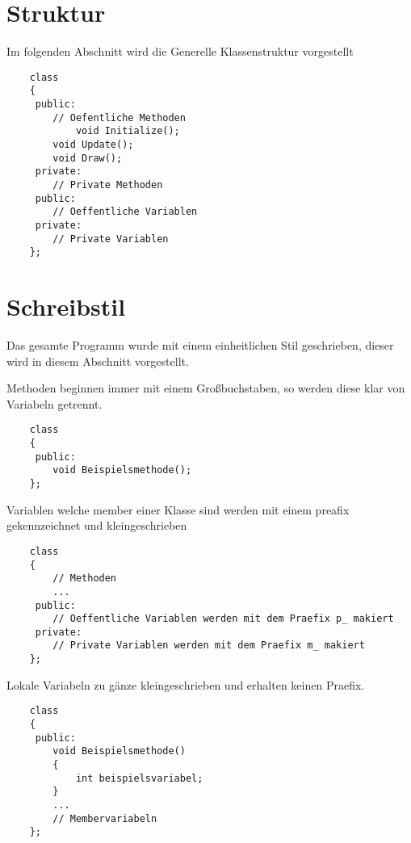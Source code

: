 
\section{Struktur}
Im folgenden Abschnitt wird die Generelle Klassenstruktur vorgestellt

\begin{lstlisting}	
	class
	{
	 public:
		// Oefentliche Methoden
	        void Initialize(); 
		void Update(); 
		void Draw(); 
 	 private: 
		// Private Methoden
	 public: 
		// Oeffentliche Variablen
	 private:
		// Private Variablen
	};
\end{lstlisting}

\section{Schreibstil}
Das gesamte Programm wurde mit einem einheitlichen Stil geschrieben, dieser wird in diesem Abschnitt vorgestellt. 

Methoden beginnen immer mit einem Großbuchstaben, so werden diese klar von Variabeln getrennt.

\begin{lstlisting}	
	class
	{
	 public:
		void Beispielsmethode(); 
	};
\end{lstlisting}

Variablen welche member einer Klasse sind werden mit einem preafix gekennzeichnet und kleingeschrieben

\begin{lstlisting}
	class
	{
		// Methoden
		...
	 public: 
		// Oeffentliche Variablen werden mit dem Praefix p_ makiert
	 private:
		// Private Variablen werden mit dem Praefix m_ makiert
	};
\end{lstlisting}

Lokale Variabeln zu gänze kleingeschrieben und erhalten keinen Praefix. 

\begin{lstlisting}
	class
	{
	 public:
		void Beispielsmethode()
		{
			int beispielsvariabel; 
		}
		...
		// Membervariabeln
	};
\end{lstlisting}

